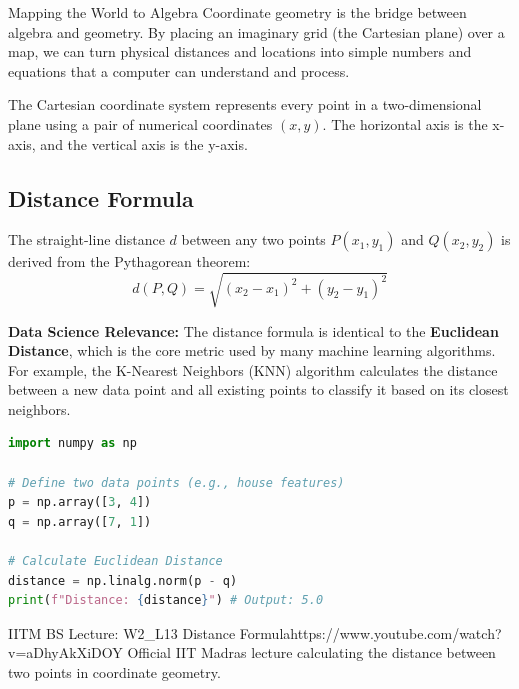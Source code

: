\begin{intuitionbox}{Mapping the World to Algebra}
Coordinate geometry is the bridge between algebra and geometry. By placing an imaginary grid (the Cartesian plane) over a map, we can turn physical distances and locations into simple numbers and equations that a computer can understand and process.
\end{intuitionbox}

The Cartesian coordinate system represents every point in a two-dimensional plane using a pair of numerical coordinates $(x, y)$. The horizontal axis is the x-axis, and the vertical axis is the y-axis.

\subsection{Distance Formula}
The straight-line distance $d$ between any two points $P(x_1, y_1)$ and $Q(x_2, y_2)$ is derived from the Pythagorean theorem:
$$d(P, Q) = \sqrt{(x_2 - x_1)^2 + (y_2 - y_1)^2}$$

\textbf{Data Science Relevance:} The distance formula is identical to the \textbf{Euclidean Distance}, which is the core metric used by many machine learning algorithms. For example, the K-Nearest Neighbors (KNN) algorithm calculates the distance between a new data point and all existing points to classify it based on its closest neighbors.

\begin{lstlisting}[language=Python, caption=Data Science: Euclidean Distance in Python]
import numpy as np

# Define two data points (e.g., house features)
p = np.array([3, 4])
q = np.array([7, 1])

# Calculate Euclidean Distance
distance = np.linalg.norm(p - q)
print(f"Distance: {distance}") # Output: 5.0
\end{lstlisting}

\begin{videocard}{IITM BS Lecture: W2\_L13 Distance Formula}{https://www.youtube.com/watch?v=aDhyAkXiDOY}
Official IIT Madras lecture calculating the distance between two points in coordinate geometry.
\end{videocard}

